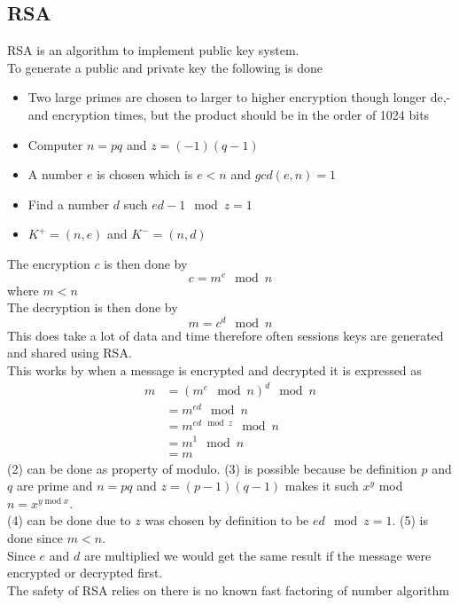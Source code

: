 \documentclass[12pt, a4paper]{article}
\begin{document}
		\subsection{RSA}
			RSA is an algorithm to implement public key system.\\
			To generate a public and private key the following is done
			\begin{itemize}
				\item Two large primes are chosen to larger to higher encryption though longer de,- and encryption times, but the product should be in the order of 1024 bits
				\item Computer $n=pq$ and $z=(-1)(q-1)$
				\item A number $e$ is chosen which is $e<n$ and $gcd(e,n)=1$
				\item Find a number $d$ such $ed-1 \mod z=1$ 
				\item $K^+=(n,e)$ and $K^-=(n,d)$
			\end{itemize}
			The encryption $c$ is then done by
			$$c=m^e\mod n$$ where $m<n$\\
			The decryption is then done by
			$$m=c^d\mod n$$
			This does take a lot of data and time therefore often sessions keys are generated and shared using RSA.\\
			This works by when a message is encrypted and decrypted it is expressed as
			\begin{align}
				m&=(m^e\mod n)^d\mod n\\
				&=m^{ed}\mod n\\
				&=m^{ed\mod z}\mod n\\
				&=m^1\mod n\\
				&=m
			\end{align}
			(2) can be done as property of modulo. (3) is possible because be definition $p$ and $q$ are prime and $n=pq$ and $z=(p-1)(q-1)$ makes it such $x^y$ mod $n=x^{y\;\text{mod}\;x}$.\\
			(4) can be done due to $z$ was chosen by definition to be $ed\mod z = 1$. (5) is done since $m<n$.\\
			Since $e$ and $d$ are multiplied we would get the same result if the message were encrypted or decrypted first.\\[4mm]
			The safety of RSA relies on there is no known fast factoring of number algorithm
			
\end{document}
